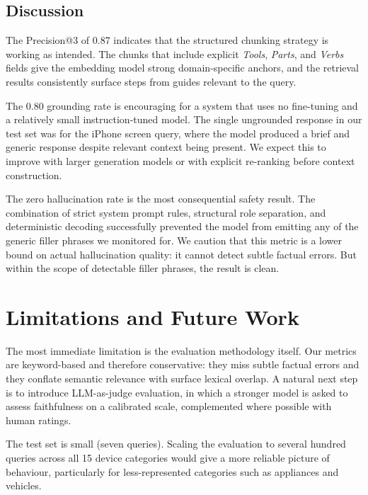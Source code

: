 \documentclass[journal,onecolumn]{IEEEtran}
\begin{document}
\subsection{Discussion}

The Precision@3 of 0.87 indicates that the structured chunking strategy is
working as intended. The chunks that include explicit \emph{Tools},
\emph{Parts}, and \emph{Verbs} fields give the embedding model strong
domain-specific anchors, and the retrieval results consistently surface
steps from guides relevant to the query.

The 0.80 grounding rate is encouraging for a system that uses no fine-tuning
and a relatively small instruction-tuned model. The single ungrounded
response in our test set was for the iPhone screen query, where the model
produced a brief and generic response despite relevant context being
present. We expect this to improve with larger generation models or with
explicit re-ranking before context construction.

The zero hallucination rate is the most consequential safety result. The
combination of strict system prompt rules, structural role separation, and
deterministic decoding successfully prevented the model from emitting any of
the generic filler phrases we monitored for. We caution that this metric is
a lower bound on actual hallucination quality: it cannot detect subtle
factual errors. But within the scope of detectable filler phrases, the
result is clean.

\section{Limitations and Future Work}
\label{sec:limitations}

The most immediate limitation is the evaluation methodology itself. Our
metrics are keyword-based and therefore conservative: they miss subtle
factual errors and they conflate semantic relevance with surface lexical
overlap. A natural next step is to introduce LLM-as-judge evaluation, in
which a stronger model is asked to assess faithfulness on a calibrated
scale, complemented where possible with human ratings.

The test set is small (seven queries). Scaling the evaluation to several
hundred queries across all 15 device categories would give a more reliable
picture of behaviour, particularly for less-represented categories such as
appliances and vehicles.
\end{document}

